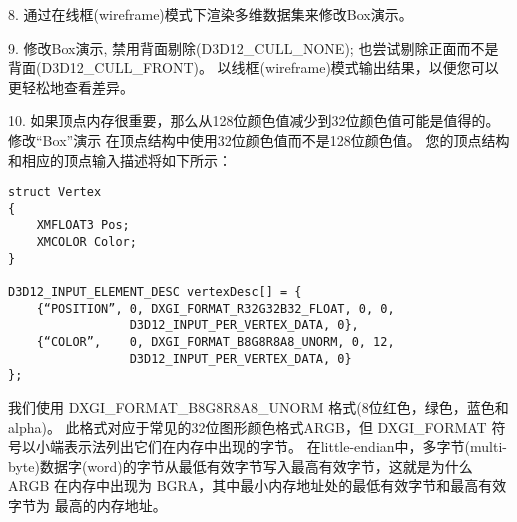 \begin{flushleft}
8. 通过在线框(wireframe)模式下渲染多维数据集来修改Box演示。
\end{flushleft}

\begin{flushleft}
9. 修改Box演示, 禁用背面剔除(D3D12\_CULL\_NONE); 也尝试剔除正面而不是背面(D3D12\_CULL\_FRONT)。 以线框(wireframe)模式输出结果，以便您可以更轻松地查看差异。
\end{flushleft}

\begin{flushleft}
10. 如果顶点内存很重要，那么从128位颜色值减少到32位颜色值可能是值得的。修改“Box”演示 在顶点结构中使用32位颜色值而不是128位颜色值。 您的顶点结构和相应的顶点输入描述将如下所示：\\
\end{flushleft}
\begin{lstlisting}
struct Vertex
{
    XMFLOAT3 Pos;
    XMCOLOR Color;
}

D3D12_INPUT_ELEMENT_DESC vertexDesc[] = {
    {“POSITION”, 0, DXGI_FORMAT_R32G32B32_FLOAT, 0, 0, 
                 D3D12_INPUT_PER_VERTEX_DATA, 0},
    {“COLOR”,    0, DXGI_FORMAT_B8G8R8A8_UNORM, 0, 12,
                 D3D12_INPUT_PER_VERTEX_DATA, 0}
};
\end{lstlisting}
\begin{flushleft}
我们使用 DXGI\_FORMAT\_B8G8R8A8\_UNORM 格式(8位红色，绿色，蓝色和alpha)。 此格式对应于常见的32位图形颜色格式ARGB，但 DXGI\_FORMAT 符号以小端表示法列出它们在内存中出现的字节。 在little-endian中，多字节(multi-byte)数据字(word)的字节从最低有效字节写入最高有效字节，这就是为什么 ARGB 在内存中出现为 BGRA，其中最小内存地址处的最低有效字节和最高有效字节为 最高的内存地址。
\end{flushleft}

